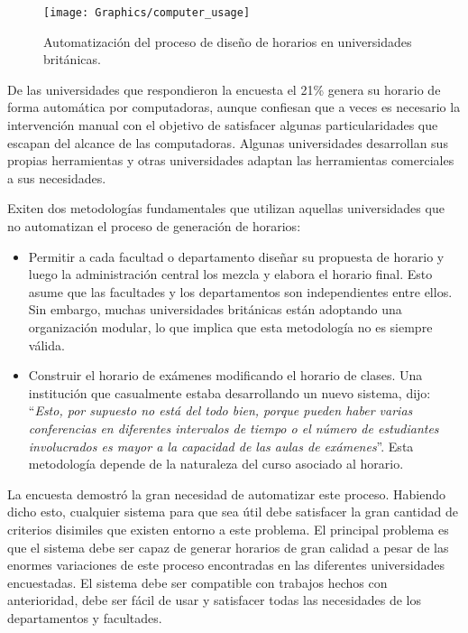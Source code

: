 \begin{figure}
	\begin{center}
		\texttt{[image: Graphics/computer\_usage]}
		\caption{Automatización del proceso de diseño de horarios en universidades británicas.}
	\end{center}	
\end{figure}

De las universidades que respondieron la encuesta el 21\% genera su horario de forma automática por
computadoras, aunque confiesan que a veces es necesario la intervención manual con el objetivo de satisfacer
algunas particularidades que escapan del alcance de las computadoras. Algunas universidades desarrollan
sus propias herramientas y otras universidades adaptan las herramientas comerciales a sus necesidades.

Exiten dos metodologías fundamentales que utilizan aquellas universidades que no automatizan el proceso de
generación de horarios:

\begin{itemize}
	\item Permitir a cada facultad o departamento diseñar su propuesta de horario y luego la administración
		central los mezcla y elabora el horario final. Esto asume que las facultades y los departamentos
		son independientes entre ellos. Sin embargo, muchas universidades británicas están adoptando una
		organización modular, lo que implica que esta metodología no es siempre válida.
	\item Construir el horario de exámenes modificando el horario de clases. Una institución que casualmente
		estaba desarrollando un nuevo sistema, dijo: ``\emph{Esto, por supuesto no está del todo bien, porque
		pueden haber varias conferencias en diferentes intervalos de tiempo o el número de estudiantes involucrados
		es mayor a la capacidad de las aulas de exámenes}''. Esta metodología depende de la naturaleza del curso
		asociado al horario.
\end{itemize}

La encuesta demostró la gran necesidad de automatizar este proceso. Habiendo dicho esto, cualquier sistema
para que sea útil debe satisfacer la gran cantidad de criterios disimiles que existen entorno a este problema.
El principal problema es que el sistema debe ser capaz de generar horarios de gran calidad a pesar de las enormes
variaciones de este proceso encontradas en las diferentes universidades encuestadas. El sistema debe ser compatible
con trabajos hechos con anterioridad, debe ser fácil de usar y satisfacer todas las necesidades de los departamentos y facultades.

